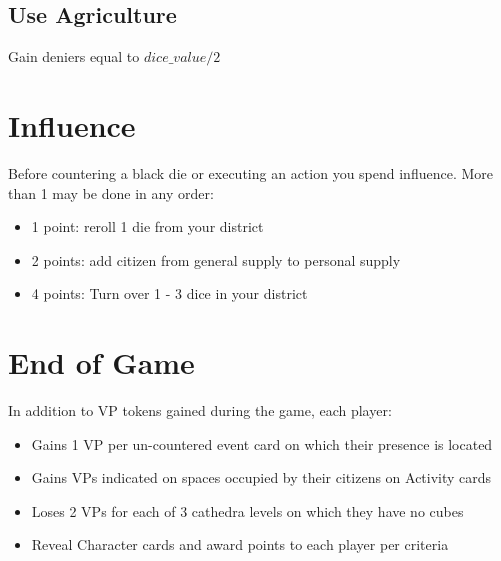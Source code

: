 \documentclass[10pt]{article}
\newenvironment{itemizeCustom}
{\begin{itemize}
  \setlength{\itemsep}{1pt}
  \setlength{\parskip}{0pt}
  \setlength{\parsep}{0pt}}
{\end{itemize}}
\begin{document}
\begin{multicols*}{2}
\subsection*{Use Agriculture}
Gain deniers equal to \(dice\_value / 2\)

\section*{Influence}
Before countering a black die or executing an action you spend influence. More than 1 may be done in any order:
\begin{itemizeCustom}
    \item 1 point: reroll 1 die from your district
    \item 2 points: add citizen from general supply to personal supply
    \item 4 points: Turn over 1 - 3 dice in your district
\end{itemizeCustom}

\section*{End of Game}
In addition to VP tokens gained during the game, each player:
\begin{itemizeCustom}
    \item Gains 1 VP per un-countered event card on which their presence is located
    \item Gains VPs indicated on spaces occupied by their citizens on Activity cards
    \item Loses 2 VPs for each of 3 cathedra levels on which they have no cubes
    \item Reveal Character cards and award points to each player per criteria
\end{itemizeCustom}

\end{multicols*}
\end{document}
